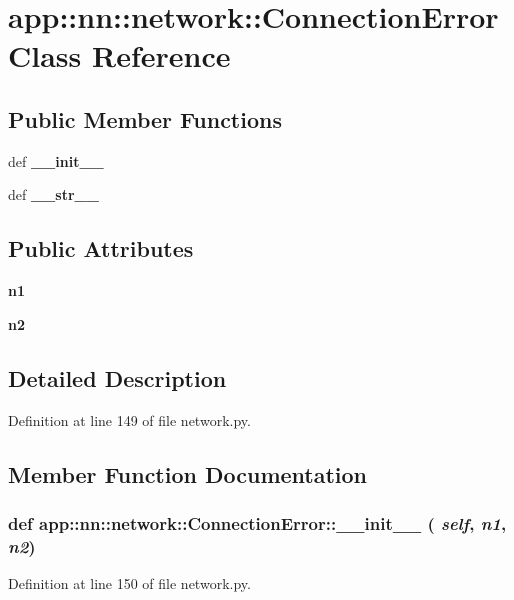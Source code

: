 \section{app::nn::network::ConnectionError Class Reference}
\label{classapp_1_1nn_1_1network_1_1ConnectionError}
\subsection*{Public Member Functions}
\begin{CompactItemize}
\item 
def {\bf \_\-\_\-init\_\-\_\-}
\item 
def {\bf \_\-\_\-str\_\-\_\-}
\end{CompactItemize}
\subsection*{Public Attributes}
\begin{CompactItemize}
\item 
{\bf n1}
\item 
{\bf n2}
\end{CompactItemize}


\subsection{Detailed Description}


Definition at line 149 of file network.py.

\subsection{Member Function Documentation}
\subsubsection{\setlength{\rightskip}{0pt plus 5cm}def app::nn::network::ConnectionError::\_\-\_\-init\_\-\_\- ( {\em self},  {\em n1},  {\em n2})}\label{classapp_1_1nn_1_1network_1_1ConnectionError_224d486a652b2857935dff43e20ac31a}




Definition at line 150 of file network.py.
